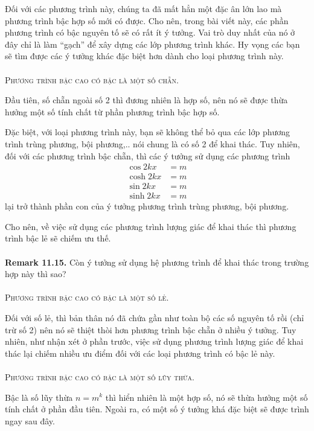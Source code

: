 \documentclass[a4paper,oneside]{book}
\numberwithin{equation}{chapter}
\begin{document}
Đối với các phương trình này, chúng ta đã mất hẳn một đặc ân lớn lao mà phương trình bậc hợp số mới có được. Cho nên, trong bài viết này, các phần phương trình có bậc nguyên tố sẽ có rất ít ý tưởng. Vai trò duy nhất của nó ở đây chỉ là làm ``gạch'' để xây dựng các lớp phương trình khác. Hy vọng các bạn sẽ tìm được các ý tưởng khác đặc biệt hơn dành cho loại phương trình này.\\
\\
\textsc{Phương trình bậc cao có bậc là một số chẵn.}

Đầu tiên, số chẵn ngoài số 2 thì đương nhiên là hợp số, nên nó sẽ được thừa hưởng một số tính chất từ phần phương trình bậc hợp số. 

Đặc biệt, với loại phương trình này, bạn sẽ không thể bỏ qua các lớp phương trình trùng phương, bội phương,.. nói chung là có số 2 để khai thác. Tuy nhiên, đối với các phương trình bậc chẵn, thì các ý tưởng sử dụng các phương trình 
\begin{align}
\cos 2kx &= m\\
\cosh 2kx &= m\\
\sin 2kx &= m\\
\sinh 2kx &= m
\end{align}
lại trở thành phần con của ý tưởng phương trình trùng phương, bội phương.

Cho nên, về việc sử dụng các phương trình lượng giác để khai thác thì phương trình bậc lẻ sẽ chiếm ưu thế.\\
\\
\textbf{Remark 11.15.} Còn ý tưởng sử dụng hệ phương trình để khai thác trong trường hợp này thì sao?\\
\\
\textsc{Phương trình bậc cao có bậc là một số lẻ.}

Đối với số lẻ, thì bản thân nó đã chứa gần như toàn bộ các số nguyên tố rồi (chỉ trừ số 2) nên nó sẽ thiệt thòi hơn phương trình bậc chẵn ở nhiều ý tưởng. Tuy nhiên, như nhận xét ở phần trước, việc sử dụng phương trình lượng giác để khai thác lại chiếm nhiều ưu điểm đối với các loại phương trình có bậc lẻ này.\\
\\
\textsc{Phương trình bậc cao có bậc là một số lũy thừa.} 

Bậc là số lũy thừa $n = {m^k}$ thì hiển nhiên là một hợp số, nó sẽ thừa hưởng một số tính chất ở phần đầu tiên. Ngoài ra, có một số ý tưởng khá đặc biệt sẽ được trình ngay sau đây.
\end{document}

